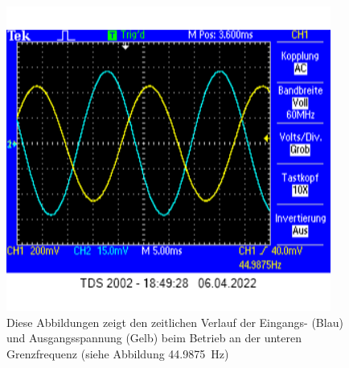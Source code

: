 \documentclass[12pt,english,ngerman]{scrartcl}
\begin{document}
\begin{figure}[H]
  \centering
    \includegraphics[width=\linewidth, height=10cm]{./figures/messungen/unteregrenze.png}
    \caption{Diese Abbildungen zeigt den zeitlichen Verlauf der Eingangs- (Blau) und
    Ausgangsspannung (Gelb) beim Betrieb an der unteren Grenzfrequenz (siehe Abbildung
  \SI{44.9875}{\hertz})}
  \label{fig:oszi_untergrenzfrequenz}
\end{figure}





\end{document}
